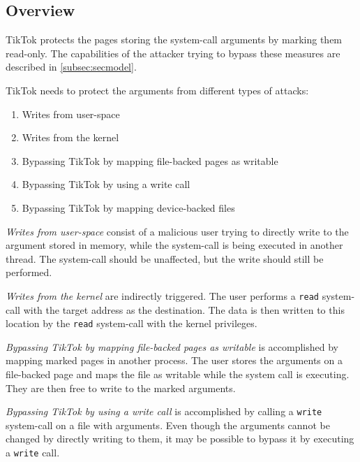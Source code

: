 \subsection{Overview}
\label{subsec:designoverview}

TikTok protects the pages storing the system-call arguments by marking them
read-only. The capabilities of the attacker trying to bypass these measures
are described in \cref{subsec:secmodel}.


TikTok needs to protect the arguments from different types of attacks:

\begin{enumerate}
  \item \label{first} Writes from user-space
  \item \label{second} Writes from the kernel
  \item \label{third} Bypassing TikTok by mapping file-backed pages as writable
  \item \label{fourth} Bypassing TikTok by using a write call
  \item \label{fifth} Bypassing TikTok by mapping device-backed files
\end{enumerate}

\emph{Writes from user-space} consist of a malicious user trying to directly
write to the argument stored in memory, while the system-call is being executed
in another thread. The system-call should be unaffected, but the write should
still be performed.

\emph{Writes from the kernel} are indirectly triggered. The user performs a \texttt{read}
system-call with the target address as the destination. The data is then written
to this location by the \texttt{read} system-call with the kernel privileges.

\emph{Bypassing TikTok by mapping file-backed pages as writable} is accomplished
by mapping marked pages in another process. The user stores the arguments on a
file-backed page and maps the file as writable while the system call is executing.
They are then free to write to the marked arguments.

\emph{Bypassing TikTok by using a write call} is accomplished by calling a
\texttt{write} system-call on a file with arguments. Even though the arguments
cannot be changed by directly writing to them, it may be possible to bypass it
by executing a \texttt{write} call.

